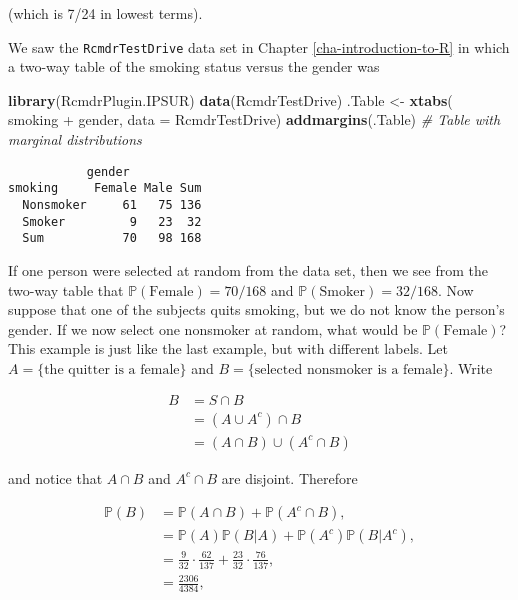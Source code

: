 \documentclass[]{book}
\newenvironment{Shaded}{\begin{snugshade}}{\end{snugshade}}
\newcommand{\KeywordTok}[1]{\textcolor[rgb]{0.13,0.29,0.53}{\textbf{{#1}}}}
\newcommand{\DataTypeTok}[1]{\textcolor[rgb]{0.13,0.29,0.53}{{#1}}}
\newcommand{\StringTok}[1]{\textcolor[rgb]{0.31,0.60,0.02}{{#1}}}
\newcommand{\CommentTok}[1]{\textcolor[rgb]{0.56,0.35,0.01}{\textit{{#1}}}}
\newcommand{\NormalTok}[1]{{#1}}
\numberwithin{equation}{chapter}
\numberwithin{figure}{chapter}
\theoremstyle{plain}
\theoremstyle{definition}
\theoremstyle{remark}
\theoremstyle{definition}
\theoremstyle{definition}
\theoremstyle{remark}
\let\BeginKnitrBlock\begin \let\EndKnitrBlock\end
\begin{document}
(which is 7/24 in lowest terms).

\bigskip

\BeginKnitrBlock{example}
\protect\hypertarget{ex:unnamed-chunk-166}{}{\label{ex:unnamed-chunk-166}}We
saw the \texttt{RcmdrTestDrive} data set in Chapter
\ref{cha-introduction-to-R} in which a two-way table of the smoking
status versus the gender was
\EndKnitrBlock{example}

\begin{Shaded}
\begin{Highlighting}[]
\KeywordTok{library}\NormalTok{(RcmdrPlugin.IPSUR)}
\KeywordTok{data}\NormalTok{(RcmdrTestDrive)  }
\NormalTok{.Table <-}\StringTok{ }\KeywordTok{xtabs}\NormalTok{( ~}\StringTok{ }\NormalTok{smoking +}\StringTok{ }\NormalTok{gender, }\DataTypeTok{data =} \NormalTok{RcmdrTestDrive)}
\KeywordTok{addmargins}\NormalTok{(.Table) }\CommentTok{# Table with marginal distributions}
\end{Highlighting}
\end{Shaded}

\begin{verbatim}
           gender
smoking     Female Male Sum
  Nonsmoker     61   75 136
  Smoker         9   23  32
  Sum           70   98 168
\end{verbatim}

If one person were selected at random from the data set, then we see
from the two-way table that \(\mathbb{P}(\mbox{Female})=70/168\) and
\(\mathbb{P}(\mbox{Smoker})=32/168\). Now suppose that one of the
subjects quits smoking, but we do not know the person's gender. If we
now select one nonsmoker at random, what would be
\(\mathbb{P}(\mbox{Female})\)? This example is just like the last
example, but with different labels. Let
\(A = \{ \mbox{the quitter is a female} \}\) and
\(B = \{ \mbox{selected nonsmoker is a female} \} \). Write

\begin{align*}
B & =S\cap B\\
 & =(A\cup A^{c})\cap B\\
 & =(A\cap B)\cup(A^{c}\cap B)
\end{align*}

and notice that \(A\cap B\) and \(A^{c}\cap B\) are disjoint. Therefore

\begin{align*}
\mathbb{P}(B) & =\mathbb{P}(A\cap B)+\mathbb{P}(A^{c}\cap B),\\
 & =\mathbb{P}(A)\mathbb{P}(B|A)+\mathbb{P}(A^{c})\mathbb{P}(B|A^{c}),\\
 & =\frac{9}{32}\cdot\frac{62}{137}+\frac{23}{32}\cdot\frac{76}{137},\\
 & =\frac{2306}{4384},
\end{align*}
\end{document}
